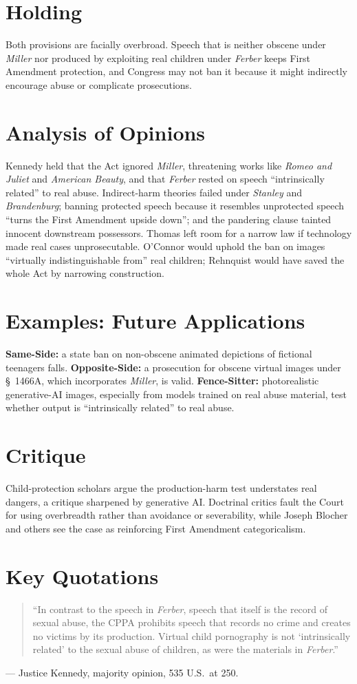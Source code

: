 \documentclass[12pt]{article}
\begin{document}
\section{Holding}
Both provisions are facially overbroad. Speech that is neither obscene under \textit{Miller} nor produced by exploiting real children under \textit{Ferber} keeps First Amendment protection, and Congress may not ban it because it might indirectly encourage abuse or complicate prosecutions.

\section{Analysis of Opinions}
Kennedy held that the Act ignored \textit{Miller}, threatening works like \textit{Romeo and Juliet} and \textit{American Beauty}, and that \textit{Ferber} rested on speech ``intrinsically related'' to real abuse. Indirect-harm theories failed under \textit{Stanley} and \textit{Brandenburg}; banning protected speech because it resembles unprotected speech ``turns the First Amendment upside down''; and the pandering clause tainted innocent downstream possessors. Thomas left room for a narrow law if technology made real cases unprosecutable. O'Connor would uphold the ban on images ``virtually indistinguishable from'' real children; Rehnquist would have saved the whole Act by narrowing construction.

\section{Examples: Future Applications}
\textbf{Same-Side:} a state ban on non-obscene animated depictions of fictional teenagers falls. \textbf{Opposite-Side:} a prosecution for obscene virtual images under \S~1466A, which incorporates \textit{Miller}, is valid. \textbf{Fence-Sitter:} photorealistic generative-AI images, especially from models trained on real abuse material, test whether output is ``intrinsically related'' to real abuse.

\section{Critique}
Child-protection scholars argue the production-harm test understates real dangers, a critique sharpened by generative AI. Doctrinal critics fault the Court for using overbreadth rather than avoidance or severability, while Joseph Blocher and others see the case as reinforcing First Amendment categoricalism.

\section{Key Quotations}
\begin{quote}
``In contrast to the speech in \textit{Ferber}, speech that itself is the record of sexual abuse, the CPPA prohibits speech that records no crime and creates no victims by its production. Virtual child pornography is not `intrinsically related' to the sexual abuse of children, as were the materials in \textit{Ferber}.''
\end{quote}
\noindent --- Justice Kennedy, majority opinion, 535 U.S.\ at 250.
\end{document}
